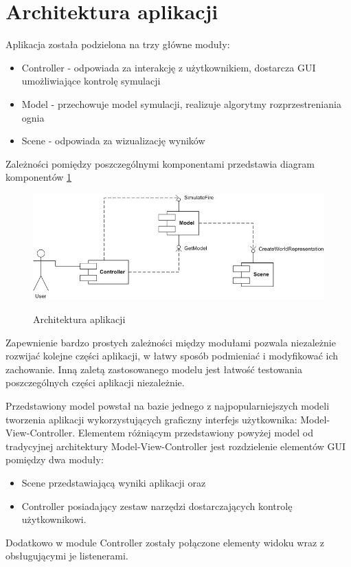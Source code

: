 \section {Architektura aplikacji}
Aplikacja została podzielona na trzy główne moduły:
\begin{itemize}
\item Controller - odpowiada za interakcję z użytkownikiem, dostarcza GUI umożliwiające kontrolę symulacji
\item Model - przechowuje model symulacji, realizuje algorytmy rozprzestreniania ognia
\item Scene - odpowiada za wizualizację wyników
\end{itemize}
Zależności pomiędzy poszczególnymi komponentami przedstawia diagram komponentów \ref{architektura aplikacji}
\begin{figure}
\begin {center}
\includegraphics{componentDiagram.jpg} \\
\caption { Architektura aplikacji}
\label {architektura aplikacji}
\end {center}
\end{figure}
Zapewnienie bardzo prostych zależności między modułami pozwala niezależnie rozwijać kolejne części aplikacji, w łatwy
sposób podmieniać i modyfikować ich zachowanie. Inną zaletą zastosowanego modelu jest łatwość
testowania poszczególnych części aplikacji niezależnie.

Przedstawiony model powstał na bazie jednego z najpopularniejszych modeli tworzenia aplikacji wykorzystujących graficzny interfejs użytkownika: Model-View-Controller. Elementem różniącym przedstawiony powyżej model od tradycyjnej architektury Model-View-Controller
jest rozdzielenie elementów GUI pomiędzy dwa moduły:
\begin{itemize}
\item Scene przedstawiającą wyniki aplikacji oraz
\item Controller posiadający zestaw narzędzi dostarczających kontrolę użytkownikowi.
\end {itemize}
Dodatkowo w module Controller zostały połączone elementy widoku wraz z obsługującymi je listenerami.
